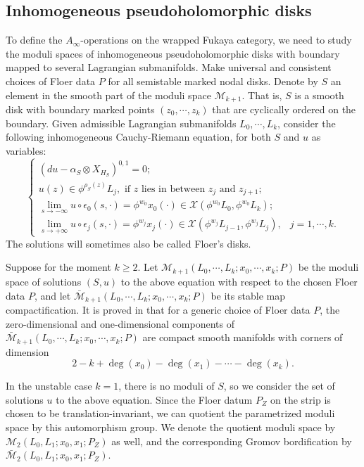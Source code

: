 \documentclass{amsart}
\numberwithin{equation}{section}
\numberwithin{figure}{section}
\begin{document}
\subsection{Inhomogeneous pseudoholomorphic disks}
	To define the $A_{\infty}$-operations on the wrapped Fukaya category, we need to study the moduli spaces of inhomogeneous pseudoholomorphic disks with boundary mapped to several Lagrangian submanifolds. Make universal and consistent choices of Floer data $P$ for all semistable marked nodal disks. Denote by $S$ an element in the smooth part of the moduli space $\mathcal{M}_{k+1}$. That is, $S$ is a smooth disk with boundary marked points $(z_{0}, \cdots, z_{k})$ that are cyclically ordered on the boundary. Given admissible Lagrangian submanifolds $L_{0}, \cdots, L_{k}$, consider the following inhomogeneous Cauchy-Riemann equation, for both $S$ and $u$ as variables:
\begin{equation}
\begin{cases}
(du - \alpha_{S} \otimes X_{H_{S}})^{0, 1} = 0;\\
u(z) \in \phi^{\rho_{S}(z)}L_{j}, \text{ if $z$ lies in between $z_{j}$ and $z_{j+1}$};\\
\lim\limits_{s \to -\infty} u \circ \epsilon_{0}(s, \cdot) = \phi^{w_{0}}x_{0}(\cdot) \in \mathcal{X}(\phi^{w_{0}}L_{0}, \phi^{w_{0}}L_{k});\\
\lim\limits_{s \to +\infty} u \circ \epsilon_{j}(s, \cdot) = \phi^{w_{j}}x_{j}(\cdot) \in \mathcal{X}(\phi^{w_{j}}L_{j-1}, \phi^{w_{j}}L_{j}), & j = 1, \cdots, k.
\end{cases}
\end{equation} 
The solutions will sometimes also be called Floer's disks. \par
	Suppose for the moment $k \ge 2$. Let $\mathcal{M}_{k+1}(L_{0}, \cdots, L_{k}; x_{0}, \cdots, x_{k}; P)$ be the moduli space of solutions $(S, u)$ to the above equation with respect to the chosen Floer data $P$, and let $\bar{\mathcal{M}}_{k+1}(L_{0}, \cdots, L_{k}; x_{0}, \cdots, x_{k}; P)$ be its stable map compactification. It is proved in \cite{Abouzaid1} that for a generic choice of Floer data $P$, the zero-dimensional and one-dimensional components of $\bar{\mathcal{M}}_{k+1}(L_{0}, \cdots, L_{k}; x_{0}, \cdots, x_{k}; P)$ are compact smooth manifolds with corners of dimension 
\begin{equation*}	
2 - k + \deg(x_{0}) - \deg(x_{1}) - \cdots - \deg(x_{k}).
\end{equation*} \par
	In the unstable case $k=1$, there is no moduli of $S$, so we consider the set of solutions $u$ to the above equation. Since the Floer datum $P_{Z}$ on the strip is chosen to be translation-invariant, we can quotient the parametrized moduli space by this automorphism group. We denote the quotient moduli space by $\mathcal{M}_{2}(L_{0}, L_{1}; x_{0}, x_{1}; P_{Z})$ as well, and the corresponding Gromov bordification by $\bar{\mathcal{M}}_{2}(L_{0}, L_{1}; x_{0}, x_{1}; P_{Z})$. \par
\end{document}
